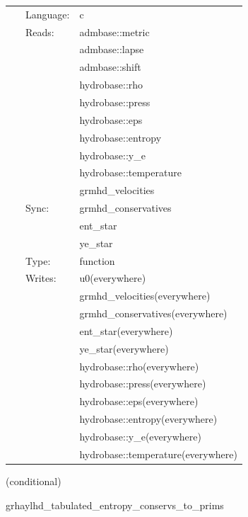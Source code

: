  \begin{tabular*}{160mm}{cll} 
~ & Language:  & c \\ 
~ & Reads:  & admbase::metric \\ 
~& ~ &admbase::lapse\\ 
~& ~ &admbase::shift\\ 
~& ~ &hydrobase::rho\\ 
~& ~ &hydrobase::press\\ 
~& ~ &hydrobase::eps\\ 
~& ~ &hydrobase::entropy\\ 
~& ~ &hydrobase::y\_e\\ 
~& ~ &hydrobase::temperature\\ 
~& ~ &grmhd\_velocities\\ 
~ & Sync:  & grmhd\_conservatives \\ 
~& ~ &ent\_star\\ 
~& ~ &ye\_star\\ 
~ & Type:  & function \\ 
~ & Writes:  & u0(everywhere) \\ 
~& ~ &grmhd\_velocities(everywhere)\\ 
~& ~ &grmhd\_conservatives(everywhere)\\ 
~& ~ &ent\_star(everywhere)\\ 
~& ~ &ye\_star(everywhere)\\ 
~& ~ &hydrobase::rho(everywhere)\\ 
~& ~ &hydrobase::press(everywhere)\\ 
~& ~ &hydrobase::eps(everywhere)\\ 
~& ~ &hydrobase::entropy(everywhere)\\ 
~& ~ &hydrobase::y\_e(everywhere)\\ 
~& ~ &hydrobase::temperature(everywhere)\\ 
\end{tabular*} 


\vspace{5mm}

   (conditional) 

\hspace{5mm} grhaylhd\_tabulated\_entropy\_conservs\_to\_prims 

\hspace{5mm}{\it entropy+tabulated version of grhaylhd\_conservs\_to\_prims } 


\hspace{5mm}

